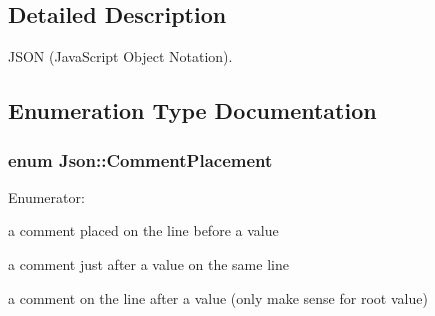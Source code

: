 \subsection{Detailed Description}
J\-S\-O\-N (Java\-Script Object Notation). 

\subsection{Enumeration Type Documentation}
\hypertarget{namespace_json_a4fc417c23905b2ae9e2c47d197a45351}{
\subsubsection[{Comment\-Placement}]{\setlength{\rightskip}{0pt plus 5cm}enum {\bf Json\-::\-Comment\-Placement}}}\label{namespace_json_a4fc417c23905b2ae9e2c47d197a45351}
\begin{Desc}
\item[Enumerator\-: ]\par
\begin{description}
\item[{\em 
\hypertarget{namespace_json_a4fc417c23905b2ae9e2c47d197a45351a52f1733775460517b2ea6bedf4906d52}{comment\-Before}\label{namespace_json_a4fc417c23905b2ae9e2c47d197a45351a52f1733775460517b2ea6bedf4906d52}
}]a comment placed on the line before a value \item[{\em 
\hypertarget{namespace_json_a4fc417c23905b2ae9e2c47d197a45351a008a230a0586de54f30b76afe70fdcfa}{comment\-After\-On\-Same\-Line}\label{namespace_json_a4fc417c23905b2ae9e2c47d197a45351a008a230a0586de54f30b76afe70fdcfa}
}]a comment just after a value on the same line \item[{\em 
\hypertarget{namespace_json_a4fc417c23905b2ae9e2c47d197a45351ac5784ca53b12250888ddb642b06aebef}{comment\-After}\label{namespace_json_a4fc417c23905b2ae9e2c47d197a45351ac5784ca53b12250888ddb642b06aebef}
}]a comment on the line after a value (only make sense for root value) \end{description}
\end{Desc}



